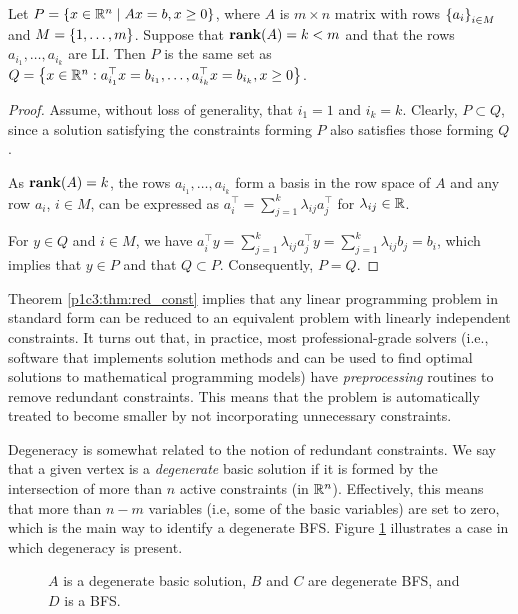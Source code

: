 \begin{theorem}\label{p1c3:thm:red_const}
	Let $P = \left\{ x \in \mathbb{R}^n \mid Ax = b, x \geq 0 \right \}$, where $A$ is $m \times n$ matrix with rows $\left\{ a_i \right \}_{i \in M}$ and $M = \left\{ 1,\dots,m \right \}$. Suppose that $\mathop{\bf rank}(A) = k < m$ and that the rows $a_{i_1}, \dots, a_{i_k}$ are LI. Then $P$ is the same set as $Q = \left\{  x \in \mathbb{R}^n : a^\top_{i_1}x = b_{i_1}, \dots, a^\top_{i_k}x = b_{i_k}, x \geq 0 \right \}$.
\end{theorem}

\begin{proof}
	Assume, without loss of generality, that $i_1 = 1$ and $i_k = k$. Clearly, $P \subset Q$, since a solution satisfying the constraints forming $P$ also satisfies those forming $Q$.
	
	As $\mathop{\bf rank}(A) = k$, the rows $a_{i_1}, \dots, a_{i_k}$ form a basis in the row space of $A$ and any row $a_i$, $i \in M$, can be expressed as $a^\top_i = \sum_{j=1}^k \lambda_{ij}a_j^\top$ for $\lambda_{ij} \in \mathbb{R}$.
	
	For $y \in Q$ and $i \in M$, we have $a_i^\top y = \sum_{j=1}^k \lambda_{ij}a_j^\top y = \sum_{j=1}^k \lambda_{ij}b_{j} = b_i$, which implies that $y \in P$ and that $Q \subset P$. Consequently, $P = Q$. \qedhere			
\end{proof}

Theorem \ref{p1c3:thm:red_const} implies that any linear programming problem in standard form can be reduced to an equivalent problem with linearly independent constraints. It turns out that, in practice, most professional-grade solvers (i.e., software that implements solution methods and can be used to find optimal solutions to mathematical programming models) have \emph{preprocessing} routines to remove redundant constraints. This means that the problem is automatically treated to become smaller by not incorporating unnecessary constraints. 

Degeneracy is somewhat related to the notion of redundant constraints. We say that a given vertex is a \emph{degenerate} basic solution if it is formed by the intersection of more than $n$ active constraints (in $\mathbb{R}^n$). Effectively, this means that more than $n-m$ variables (i.e, some of the basic variables) are set to zero, which is the main way to identify a degenerate BFS. Figure \ref{p1c3:fig:figure1} illustrates a case in which degeneracy is present.

\begin{figure}[h]
	\caption{$A$ is a degenerate basic solution, $B$ and $C$ are degenerate BFS, and $D$ is a BFS.} \label{p1c3:fig:figure1}
\end{figure} 

